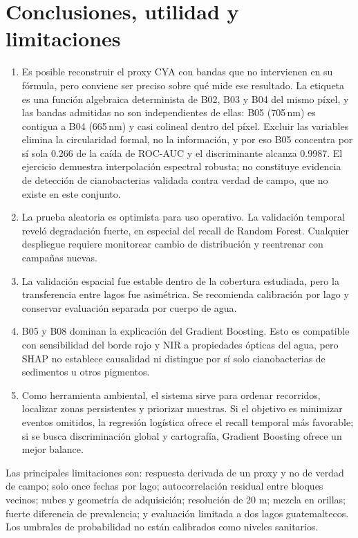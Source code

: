 \documentclass[11pt,letterpaper]{article}
\begin{document}
\section{Conclusiones, utilidad y limitaciones}

\begin{enumerate}
\item Es posible reconstruir el proxy CYA con bandas que no intervienen en su fórmula, pero conviene ser preciso sobre qué mide ese resultado. La etiqueta es una función algebraica determinista de B02, B03 y B04 del mismo píxel, y las bandas admitidas no son independientes de ellas: B05 (705\,nm) es contigua a B04 (665\,nm) y casi colineal dentro del píxel. Excluir las variables elimina la circularidad formal, no la información, y por eso B05 concentra por sí sola 0.266 de la caída de ROC-AUC y el discriminante alcanza 0.9987. El ejercicio demuestra interpolación espectral robusta; no constituye evidencia de detección de cianobacterias validada contra verdad de campo, que no existe en este conjunto.
\item La prueba aleatoria es optimista para uso operativo. La validación temporal reveló degradación fuerte, en especial del recall de Random Forest. Cualquier despliegue requiere monitorear cambio de distribución y reentrenar con campañas nuevas.
\item La validación espacial fue estable dentro de la cobertura estudiada, pero la transferencia entre lagos fue asimétrica. Se recomienda calibración por lago y conservar evaluación separada por cuerpo de agua.
\item B05 y B08 dominan la explicación del Gradient Boosting. Esto es compatible con sensibilidad del borde rojo y NIR a propiedades ópticas del agua, pero SHAP no establece causalidad ni distingue por sí solo cianobacterias de sedimentos u otros pigmentos.
\item Como herramienta ambiental, el sistema sirve para ordenar recorridos, localizar zonas persistentes y priorizar muestras. Si el objetivo es minimizar eventos omitidos, la regresión logística ofrece el recall temporal más favorable; si se busca discriminación global y cartografía, Gradient Boosting ofrece un mejor balance.
\end{enumerate}

Las principales limitaciones son: respuesta derivada de un proxy y no de verdad de campo; solo once fechas por lago; autocorrelación residual entre bloques vecinos; nubes y geometría de adquisición; resolución de 20 m; mezcla en orillas; fuerte diferencia de prevalencia; y evaluación limitada a dos lagos guatemaltecos. Los umbrales de probabilidad no están calibrados como niveles sanitarios.
\end{document}

